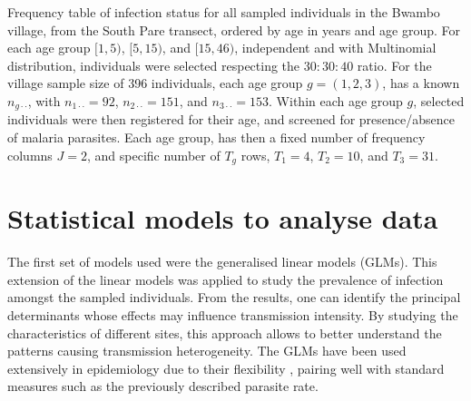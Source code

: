 \makeatletter
\begin{table}[H]
\centering
\caption[Frequency table of infection status in the Bwambo village]{Frequency table of infection status for all sampled individuals in the Bwambo village, from the South Pare transect, ordered by age in years and age group. For each age group $[1,5)$, $[5,15)$, and $[15,46)$, independent and with Multinomial distribution, individuals were selected respecting the $30:30:40$ ratio.
For the village sample size of 396 individuals, each age group $g=(1,2,3)$, has a known $n_{g\cdot\cdot}$, with $n_{1\cdot\cdot}=92$, $n_{2\cdot\cdot}=151$, and $n_{3\cdot\cdot}=153$.
Within each age group $g$, selected individuals were then registered for their age, and screened for presence/absence of malaria parasites.
Each age group, has then a fixed number of frequency columns $J=2$, and specific number of $T_g$ rows, $T_1=4$, $T_2=10$, and $T_3=31$.}
\label{tab:multinomial.bwambo}
\begin{adjustbox}{totalheight=\baselineskip}

\end{adjustbox}
\end{table}
\makeatother


\section{Statistical models to analyse data}
\label{sec:models}

The first set of models used were the generalised linear models (GLMs).
This extension of the linear models was applied to study the prevalence of infection amongst the sampled individuals.
From the results, one can identify the principal determinants whose effects may influence transmission intensity.
By studying the characteristics of different sites, this approach allows to better understand the patterns causing transmission heterogeneity.
The GLMs have been used extensively in epidemiology due to their flexibility \cite{nelder1972glm,andersson2012stochastic}, pairing well with standard measures such as the previously described parasite rate.

